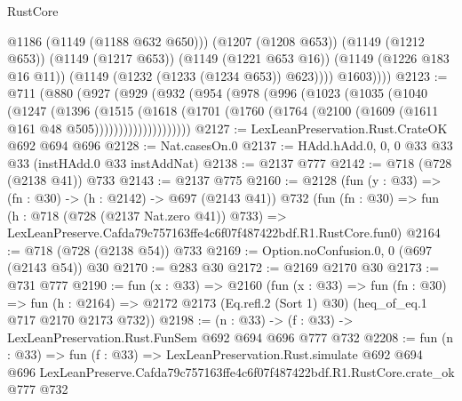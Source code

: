 \begin{lexlean}{RustCore}
\begin{coremodule}
                  @1186
                  (@1149 (@1188 @632 @650)))
                (@1207 (@1208 @653))
                (@1149 (@1212 @653))
                (@1149 (@1217 @653))
                (@1149 (@1221 @653 @16))
                (@1149 (@1226 @183 @16 @11))
                (@1149 (@1232 (@1233 (@1234 @653)) @623))))
            @1603))))
@2123 := @711
    (@880
      (@927
        (@929
          (@932
            (@954
              (@978
                (@996
                  (@1023
                    (@1035
                      (@1040
                        (@1247
                          (@1396
                            (@1515
                              (@1618
                                (@1701
                                  (@1760
                                    (@1764 (@2100 (@1609 (@1611 @161 @48 @505))))))))))))))))))))
@2127 := LexLeanPreservation.Rust.CrateOK @692 @694 @696
@2128 := Nat.casesOn.{0}
@2137 := HAdd.hAdd.{0, 0, 0} @33 @33 @33 (instHAdd.{0} @33 instAddNat)
@2138 := @2137 @777
@2142 := @718 (@728 (@2138 @41)) @733
@2143 := @2137 @775
@2160 := @2128
    (fun (y : @33) => (fn : @30) -> (h : @2142) -> @697 (@2143 @41))
    @732
    (fun (fn : @30) =>
    fun (h : @718 (@728 (@2137 Nat.zero @41)) @733) =>
    LexLeanPreserve.Cafda79c757163ffe4c6f07f487422bdf.R1.RustCore.fun0)
@2164 := @718 (@728 (@2138 @54)) @733
@2169 := Option.noConfusion.{0, 0} (@697 (@2143 @54)) @30
@2170 := @283 @30
@2172 := @2169 @2170 @30
@2173 := @731 @777
@2190 := fun (x : @33) =>
  @2160
    (fun (x : @33) =>
    fun (fn : @30) =>
    fun (h : @2164) => @2172 @2173 (Eq.refl.{2} (Sort 1) @30) (heq_of_eq.{1} @717 @2170 @2173 @732))
@2198 := (n : @33) -> (f : @33) -> LexLeanPreservation.Rust.FunSem @692 @694 @696 @777 @732
@2208 := fun (n : @33) =>
  fun (f : @33) =>
  LexLeanPreservation.Rust.simulate
    @692
    @694
    @696
    LexLeanPreserve.Cafda79c757163ffe4c6f07f487422bdf.R1.RustCore.crate_ok
    @777
    @732
\end{coremodule}
\end{lexlean}
